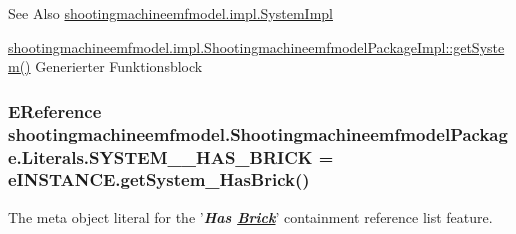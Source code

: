 \begin{DoxySeeAlso}{See Also}
\hyperlink{classshootingmachineemfmodel_1_1impl_1_1_system_impl}{shootingmachineemfmodel.\-impl.\-System\-Impl} 

\hyperlink{classshootingmachineemfmodel_1_1impl_1_1_shootingmachineemfmodel_package_impl_a79cabfebb9a8de6c66ef4b36772d16d1}{shootingmachineemfmodel.\-impl.\-Shootingmachineemfmodel\-Package\-Impl\-::get\-System()} Generierter Funktionsblock 
\end{DoxySeeAlso}
\hypertarget{interfaceshootingmachineemfmodel_1_1_shootingmachineemfmodel_package_1_1_literals_a304ec5872db835a04093f6d0223a4dcd}{
\subsubsection[{S\-Y\-S\-T\-E\-M\-\_\-\-\_\-\-H\-A\-S\-\_\-\-B\-R\-I\-C\-K}]{\setlength{\rightskip}{0pt plus 5cm}E\-Reference shootingmachineemfmodel.\-Shootingmachineemfmodel\-Package.\-Literals.\-S\-Y\-S\-T\-E\-M\-\_\-\-\_\-\-H\-A\-S\-\_\-\-B\-R\-I\-C\-K = e\-I\-N\-S\-T\-A\-N\-C\-E.\-get\-System\-\_\-\-Has\-Brick()}}\label{interfaceshootingmachineemfmodel_1_1_shootingmachineemfmodel_package_1_1_literals_a304ec5872db835a04093f6d0223a4dcd}
The meta object literal for the '{\itshape {\bfseries Has \hyperlink{interfaceshootingmachineemfmodel_1_1_brick}{Brick}}}' containment reference list feature.

